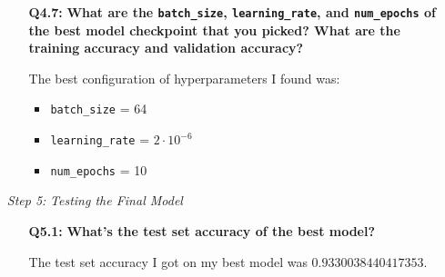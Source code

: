 \documentclass{article}
\begin{document}
\begin{itemize}
\begin{itemize}
        \item[\textbf{Q4.7:}] \textbf{What are the \texttt{batch\_size},
        \texttt{learning\_rate}, and \texttt{num\_epochs} of the best model
        checkpoint that you picked? What are the training accuracy and
        validation accuracy?}

        The best configuration of hyperparameters I found was:
        \begin{itemize}
            \item \texttt{batch\_size} = 64
            \item \texttt{learning\_rate} = $2 \cdot 10^{-6}$
            \item \texttt{num\_epochs} = 10
        \end{itemize}

    \end{itemize}

    \item[\textit{Step 5:}] \textit{Testing the Final Model}
    \begin{itemize}
        \item[\textbf{Q5.1:}] \textbf{What's the test set accuracy of the best
        model?}

        The test set accuracy I got on my best model was
        $\boxed{0.9330038440417353}$.
    \end{itemize}
    
\end{itemize}
\end{document}

